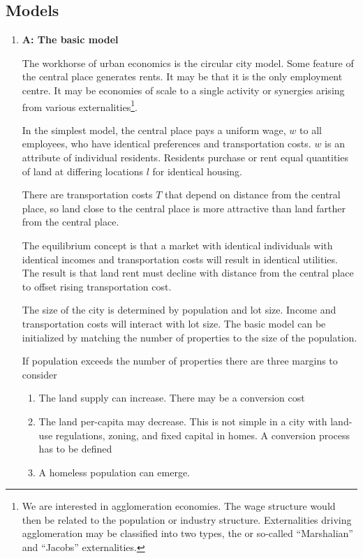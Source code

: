 \subsection{Models}
\begin{enumerate}
\item \textbf{A: The basic model}

The workhorse of urban economics is the circular city model. Some feature of the central place generates rents. It may be that it is the only employment centre. It may be economies of scale to a single activity or synergies arising from various externalities\footnote{We are interested in agglomeration economies. The wage  structure would then be related to the population or industry  structure. Externalities driving agglomeration may be classified  into two types, the  or so-called ``Marshalian''  and ``Jacobs'' externalities.}. 

In the simplest model, the central place pays a uniform wage, $w$ to all employees, who have identical preferences and transportation costs. $w$ is an attribute of individual residents. Residents  purchase or rent equal quantities of land at differing locations $l$ for identical housing.  

There are transportation costs $T$ that depend on distance from the  central place, so land close to the central place is more attractive than land farther from the central place.  

The equilibrium concept is that a market with identical individuals with identical incomes and transportation costs will result in identical utilities. The result is that land rent must decline with distance from the central place to offset rising transportation cost. 

The size of the city is determined by population and lot size. Income and transportation costs will interact with lot size. The basic model can be initialized by matching the number of properties to the size of the population. 

If population exceeds the number of properties there are three margins to consider
	\begin{enumerate}
		\item The land supply can increase. There may be a conversion cost
		\item The land per-capita may decrease. This is not simple in a city with land-use regulations, zoning, and fixed capital in homes. A conversion process has to be defined
		\item A homeless population can emerge. 
	\end{enumerate}


\end{enumerate}
